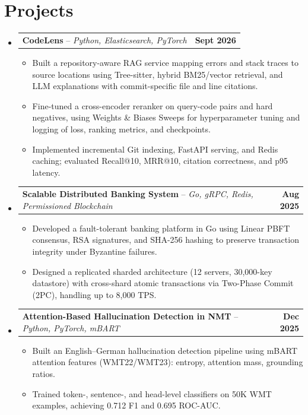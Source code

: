 \documentclass[letterpaper,11pt]{article}
\makeatletter
\newcommand{\resumeItem}[1]{
  \item\small{
    {#1 \vspace{-2pt}}
  }
}
\newcommand{\resumeProjectHeading}[2]{
    \item
    \begin{tabular*}{1.001\textwidth}{l@{\extracolsep{\fill}}r}
      \small#1 & \textbf{\small #2}\\
    \end{tabular*}\vspace{-7pt}
}
\newcommand{\resumeSubHeadingListStart}{\begin{itemize}[leftmargin=0.0in, label={}]}
\newcommand{\resumeSubHeadingListEnd}{\end{itemize}}
\newcommand{\resumeItemListStart}{\begin{itemize}}
\newcommand{\resumeItemListEnd}{\end{itemize}\vspace{-5pt}}
\makeatother
\begin{document}
\section{Projects}
    \vspace{-5pt}
    \resumeSubHeadingListStart

      \resumeProjectHeading
          {\textbf{CodeLens} -- \emph{Python, Elasticsearch, PyTorch}}{Sept 2026}
          \resumeItemListStart
            \resumeItem{Built a repository-aware RAG service mapping errors and stack traces to source locations using Tree-sitter, hybrid BM25/vector retrieval, and LLM explanations with commit-specific file and line citations.}
            \resumeItem{Fine-tuned a cross-encoder reranker on query-code pairs and hard negatives, using Weights \& Biases Sweeps for hyperparameter tuning and logging of loss, ranking metrics, and checkpoints.}
            \resumeItem{Implemented incremental Git indexing, FastAPI serving, and Redis caching; evaluated Recall@10, MRR@10, citation correctness, and p95 latency.}
          \resumeItemListEnd
          \vspace{-13pt}

      \resumeProjectHeading
          {\textbf{Scalable Distributed Banking System} -- \emph{Go, gRPC, Redis, Permissioned Blockchain}}{Aug 2025}
          \resumeItemListStart
            \resumeItem{Developed a fault-tolerant banking platform in Go using Linear PBFT consensus, RSA signatures, and SHA-256 hashing to preserve transaction integrity under Byzantine failures.}
            \resumeItem{Designed a replicated sharded architecture (12 servers, 30,000-key datastore) with cross-shard atomic transactions via Two-Phase Commit (2PC), handling up to 8,000 TPS.}
          \resumeItemListEnd
          \vspace{-13pt}

      \resumeProjectHeading
          {\textbf{Attention-Based Hallucination Detection in NMT} -- \emph{Python, PyTorch, mBART}}{Dec 2025}
          \resumeItemListStart
            \resumeItem{Built an English--German hallucination detection pipeline using mBART attention features (WMT22/WMT23): entropy, attention mass, grounding ratios.}
            \resumeItem{Trained token-, sentence-, and head-level classifiers on 50K WMT examples, achieving 0.712 F1 and 0.695 ROC-AUC.}
          \resumeItemListEnd
          \vspace{-13pt}

    \resumeSubHeadingListEnd
\end{document}
